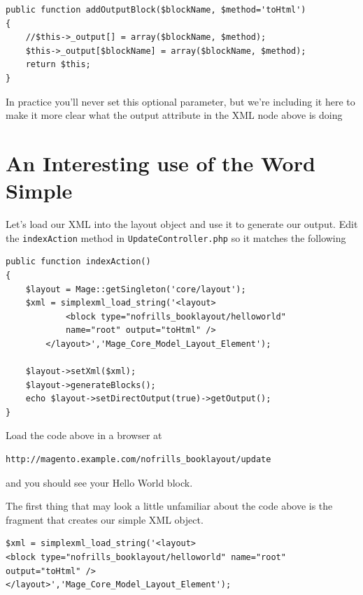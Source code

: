 \documentclass[oneside]{book}
\begin{document}
\begin{lstlisting}
public function addOutputBlock($blockName, $method='toHtml')
{
    //$this->_output[] = array($blockName, $method);
    $this->_output[$blockName] = array($blockName, $method);
    return $this;
}

\end{lstlisting}


In practice you'll never set this optional parameter, but we're including it here to make it more clear what the output attribute in the XML node above is doing

\section{An Interesting use of the Word Simple}

Let's load our XML into the layout object and use it to generate our output.  Edit the \footnotesize\texttt{indexAction} \normalsize  method in \footnotesize\texttt{UpdateController.php} \normalsize  so it matches the following

\begin{lstlisting}
public function indexAction()
{
    $layout = Mage::getSingleton('core/layout');                        
    $xml = simplexml_load_string('<layout>
            <block type="nofrills_booklayout/helloworld" 
            name="root" output="toHtml" />
        </layout>','Mage_Core_Model_Layout_Element');

    $layout->setXml($xml);
    $layout->generateBlocks();          
    echo $layout->setDirectOutput(true)->getOutput();           
}       

\end{lstlisting}


Load the code above in a browser at

\begin{lstlisting}
http://magento.example.com/nofrills_booklayout/update

\end{lstlisting}


and you should see your Hello World block.  

The first thing that may look a little unfamiliar about the code above is the fragment that creates our simple XML object.

\begin{lstlisting}
$xml = simplexml_load_string('<layout>
<block type="nofrills_booklayout/helloworld" name="root" output="toHtml" />
</layout>','Mage_Core_Model_Layout_Element');

\end{lstlisting}
\end{document}

